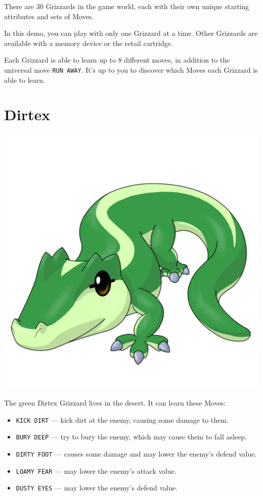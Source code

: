 \documentclass[10pt,twocolumn,openany,article]{memoir}
\begin{document}
\begin{description}
There are  30 Grizzards in  the game world,  each with their  own unique
starting attributes and sets of Moves.

\ifdefined\NOSAVE

In  this  demo,  you  can  play  with  only  one  Grizzard  at  a  time.
Other   Grizzards  are   available   with  a   memory   device  or   the
retail cartridge.

\fi

Each Grizzard is able  to learn up to 8 different  moves, in addition to
the universal move  \texttt{RUN AWAY}. It's up to you  to discover which
Moves each Grizzard is able to learn.

\ifdefined\DEMO\else

\section{Dirtex}

\includegraphics[width=\columnwidth]{../Manual/Dirtex.png}

The green Dirtex Grizzard lives in the desert. It can learn these Moves:

\begin{itemize}
\item \texttt{KICK DIRT} --- kick dirt at the enemy, causing some damage
  to them.
\item \texttt{BURY DEEP} --- try to bury the enemy, which may cause them
  to fall asleep.
\item  \texttt{DIRTY FOOT}  --- causes  some  damage and  may lower  the
  enemy's defend value.
\item \texttt{LOAMY FEAR} --- may lower the enemy's attack value.
\item \texttt{DUSTY EYES} --- may lower the enemy's defend value.
\end{itemize}


\end{description}
\end{document}
